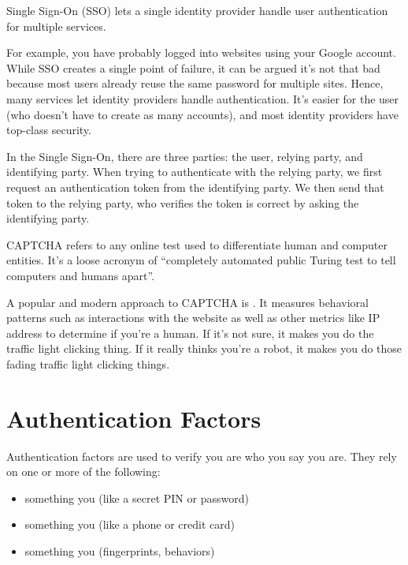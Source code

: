 \begin{dfnbox}{Single Sign-On (SSO)}{}
     lets a single identity provider handle user authentication for multiple services.
\end{dfnbox}

For example, you have probably logged into websites using your Google account. While SSO creates a single point of failure, it can be argued it's not that bad because most users already reuse the same password for multiple sites. Hence, many services let identity providers handle authentication. It's easier for the user (who doesn't have to create as many accounts), and most identity providers have top-class security.

In the Single Sign-On, there are three parties: the user, relying party, and identifying party. When trying to authenticate with the relying party, we first request an authentication token from the identifying party. We then send that token to the relying party, who verifies the token is correct by asking the identifying party.

\begin{dfnbox}{CAPTCHA}{}
     refers to any online test used to differentiate human and computer entities. It's a loose acronym of ``completely automated public Turing test to tell computers and humans apart''.
\end{dfnbox}

A popular and modern approach to CAPTCHA is . It measures behavioral patterns such as interactions with the website as well as other metrics like IP address to determine if you're a human. If it's not sure, it makes you do the traffic light clicking thing. If it really thinks you're a robot, it makes you do those fading traffic light clicking things.


\section{Authentication Factors}
Authentication factors are used to verify you are who you say you are. They rely on one or more of the following:
\begin{itemize}[noitemsep]
    \item something you  (like a secret PIN or password)
    \item something you  (like a phone or credit card)
    \item something you  (fingerprints, behaviors)
\end{itemize}

